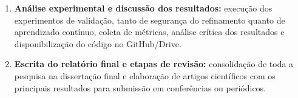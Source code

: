 \begin{enumerate}
\item \textbf{Análise experimental e discussão dos resultados:} execução dos experimentos de validação, tanto de segurança do refinamento quanto de aprendizado contínuo, coleta de métricas, análise crítica dos resultados e disponibilização do código no GitHub/Drive.


\item \textbf{Escrita do relatório final e etapas de revisão:} consolidação de toda a pesquisa na dissertação final e elaboração de artigos científicos com os principais resultados para submissão em conferências ou periódicos.


\end{enumerate}


